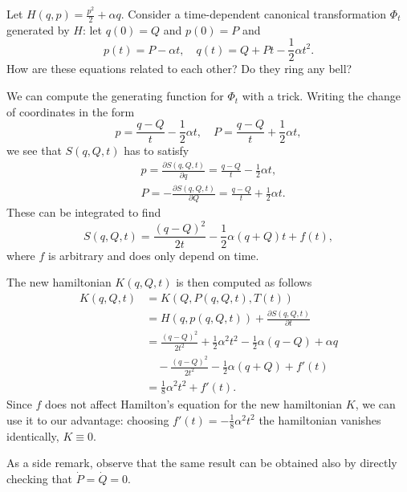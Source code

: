 \documentclass[english,fontsize=11pt,paper=a5,oneside]{scrbook}
\theoremstyle{definition}
\newenvironment{example}
  {\pushQED{\qed}\renewcommand{\qedsymbol}{$\lozenge$}\examplex}
  {\popQED\endexamplex}
\begin{document}
\begin{example}
    Let $H(q,p) = \frac{p^2}{2} + \alpha q$. Consider a time-dependent canonical transformation $\Phi_t$ generated by $H$: let $q(0) = Q$ and $p(0) = P$ and
    \begin{equation}\label{eq:unifaccm}
        p(t) = P - \alpha t, \quad
        q(t) = Q + Pt - \frac{1}{2}\alpha t^2.
    \end{equation}
    How are these equations related to each other? Do they ring any bell?

    We can compute the generating function for $\Phi_t$ with a trick. Writing the change of coordinates in the form
    \begin{equation}
        p = \frac{q-Q}{t}-\frac12\alpha t, \quad
        P = \frac{q-Q}{t} + \frac 12\alpha t,
    \end{equation}
    we see that $S(q,Q,t)$ has to satisfy
    \begin{align}
        &p = \frac{\partial S(q,Q,t)}{\partial q} = \frac{q-Q}{t} - \frac12\alpha t, \\
        &P = - \frac{\partial S(q,Q,t)}{\partial Q} = \frac{q-Q}{t} + \frac12\alpha t.
    \end{align}
    These can be integrated to find
    \begin{equation}
        S(q,Q,t) = \frac{(q-Q)^2}{2t} - \frac12 \alpha (q+Q) t + f(t),
    \end{equation}
    where $f$ is arbitrary and does only depend on time.
    
    The new hamiltonian $K(q,Q,t)$ is then computed as follows
    \begin{align}
        K(q,Q,t) & = K(Q, P(q,Q,t), T(t)) \\
        &= H(q, p(q,Q,t)) + \frac{\partial S (q,Q,t)}{\partial t} \\
        & = \frac{(q-Q)^2}{2t^2} + \frac12 \alpha^2 t^2 - \frac12 \alpha (q-Q) + \alpha q \\
        &\quad - \frac{(q-Q)^2}{2t^2} - \frac12 \alpha(q+Q) + f'(t) \\
        & = \frac{1}{8}\alpha^2t^2 + f'(t).
    \end{align}
    Since $f$ does not affect Hamilton's equation for the new hamiltonian $K$, we can use it to our advantage: choosing $f'(t) = - \frac{1}{8}\alpha^2t^2$ the hamiltonian vanishes identically, $K\equiv 0$.

    As a side remark, observe that the same result can be obtained also by directly checking that $\dot P = \dot Q = 0$.
\end{example}
\end{document}
